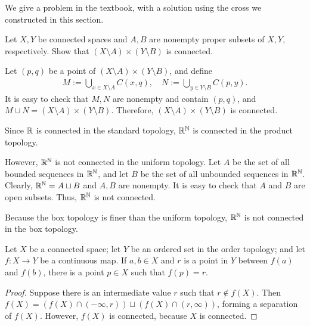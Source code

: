 We give a problem in the textbook, with a solution using the cross we constructed in this section.
\begin{prob}
    Let $X, Y$ be connected spaces and $A, B$ are nonempty proper subsets of $X, Y$, respectively.
    Show that $(X\setminus A)\times(Y\setminus B)$ is connected.
\end{prob}
\begin{sol}
    Let $(p, q)$ be a point of $(X\setminus A)\times(Y\setminus B)$, and define
    \begin{align*}
        M:=\bigcup_{x\in X\setminus A}C(x, q),\quad N:=\bigcup_{y\in Y\setminus B}C(p, y).
    \end{align*}
    It is easy to check that $M, N$ are nonempty and contain $(p, q)$, and $M\cup N=(X\setminus A)\times(Y\setminus B)$.
    Therefore, $(X\setminus A)\times(Y\setminus B)$ is connected.
\end{sol}

\begin{exmp}
    Since ${\mathbb{R}}$ is connected in the standard topology, ${\mathbb{R}}^{\mathbb{N}}$ is connected in the product topology.

    However, ${\mathbb{R}}^{\mathbb{N}}$ is not connected in the uniform topology.
    Let $A$ be the set of all bounded sequences in ${\mathbb{R}}^{\mathbb{N}}$, and let $B$ be the set of all unbounded sequences in ${\mathbb{R}}^{\mathbb{N}}$.
    Clearly, ${\mathbb{R}}^{\mathbb{N}}=A\sqcup B$ and $A, B$ are nonempty.
    It is easy to check that $A$ and $B$ are open subsets.
    Thus, ${\mathbb{R}}^{\mathbb{N}}$ is not connected.

    Because the box topology is finer than the uniform topology, ${\mathbb{R}}^{\mathbb{N}}$ is not connected in the box topology.
\end{exmp}

\begin{thm}
    Let $X$ be a connected space; let $Y$ be an ordered set in the order topology; and let $f: X\rightarrow Y$ be a continuous map.
    If $a, b\in X$ and $r$ is a point in $Y$ between $f(a)$ and $f(b)$, there is a point $p\in X$ such that $f(p)=r$.
\end{thm}
\begin{proof}
    Suppose there is an intermediate value $r$ such that $r\notin f(X)$.
    Then $f(X)=(f(X)\cap (-\infty, r))\sqcup(f(X)\cap(r, \infty))$, forming a separation of $f(X)$.
    However, $f(X)$ is connected, because $X$ is connected.
\end{proof}

